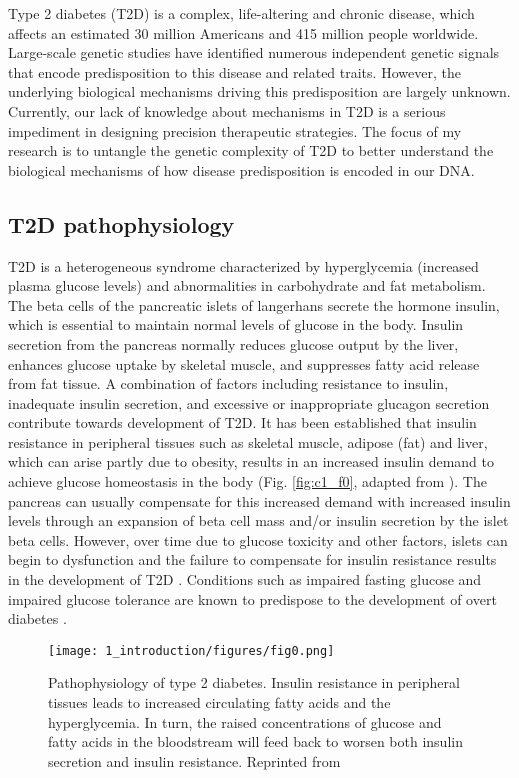 ﻿Type 2 diabetes (T2D) is a complex, life-altering and chronic disease, which affects an estimated 30 million Americans and 415 million people worldwide. Large-scale genetic studies have identified numerous independent genetic signals that encode predisposition to this disease and related traits. However, the underlying biological mechanisms driving this predisposition are largely unknown. Currently, our lack of knowledge about mechanisms in T2D is a serious impediment in designing precision therapeutic strategies. The focus of my research is to untangle the genetic complexity of T2D to better understand the biological mechanisms of how disease predisposition is encoded in our DNA.


\subsection{T2D pathophysiology}
T2D is a heterogeneous syndrome characterized by hyperglycemia (increased plasma glucose levels) and abnormalities in carbohydrate and fat metabolism. The beta cells of the pancreatic islets of langerhans secrete the hormone insulin, which is essential to maintain normal levels of glucose in the body. Insulin secretion from the pancreas normally reduces glucose output by the liver, enhances glucose uptake by skeletal muscle, and suppresses fatty acid release from fat tissue. A combination of factors including resistance to insulin, inadequate insulin secretion, and excessive or inappropriate glucagon secretion contribute towards development of T2D. It has been established that insulin resistance in peripheral tissues such as skeletal muscle, adipose (fat) and liver, which can arise partly due to obesity, results in an increased insulin demand to achieve glucose homeostasis in the body \cite{stumvollTypeDiabetesPrinciples2005} (Fig. \ref{fig:c1_f0}, adapted from \cite{stumvollTypeDiabetesPrinciples2005}). The pancreas can usually compensate for this increased demand with increased insulin levels through an expansion of beta cell mass and/or insulin secretion by the islet beta cells. However, over time due to glucose toxicity and other factors, islets can begin to dysfunction and the failure to compensate for insulin resistance results in the development of T2D \cite{kellerGeneExpressionNetwork2008}. Conditions such as impaired fasting glucose and impaired glucose tolerance are known to predispose to the development of overt diabetes \cite{stumvollTypeDiabetesPrinciples2005}.


\begin{figure}
        \centering
        \texttt{[image: 1\_introduction/figures/fig0.png]}
        \caption{Pathophysiology of type 2 diabetes. Insulin resistance in peripheral tissues leads to increased circulating fatty acids and the hyperglycemia. In turn, the raised concentrations of glucose and fatty acids in the bloodstream will feed back to worsen both insulin secretion and insulin resistance. Reprinted from \cite{stumvollTypeDiabetesPrinciples2005}}
        \label{fig:ci_f0}
\end{figure}


